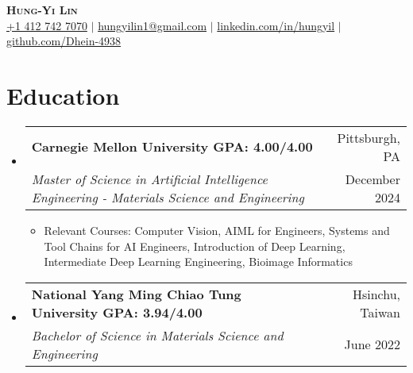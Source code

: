 \documentclass[a4paper,11pt]{article}
\makeatletter
\newcommand{\resumeItem}[1]{
  \item\small{
    {#1 \vspace{-1pt}}
  }
}
\newcommand{\resumeDoubleHeading}[4]{
  \vspace{-2pt}\item
    \begin{tabular*}{0.97\textwidth}[t]{l@{\extracolsep{\fill}}r}
        \textbf{#1} & #2 \\
        \textit{\small#3} & {\small #4} \\
    \end{tabular*}\vspace{-5pt}
}
\newcommand{\resumeSubHeadingListStart}{\begin{itemize}[leftmargin=0.15in, label={}]}
\newcommand{\resumeSubHeadingListEnd}{\end{itemize}}
\makeatother
\begin{document}

\begin{center}
    \textbf{\Huge \scshape Hung-Yi Lin} \\ \vspace{3pt}
    \small
    \faMobile \hspace{.5pt} \href{tel:14127427070}{+1 412 742 7070}
    $|$
    \faAt \hspace{.5pt} \href{mailto:hungyilin1@gmail.com}{hungyilin1@gmail.com}
    $|$
    \faLinkedinSquare \hspace{.5pt} \href{https://www.linkedin.com/in/hungyil}{linkedin.com/in/hungyil}
    $|$
    \faGithub \hspace{.5pt} \href{https://github.com/Dhein-4938}{github.com/Dhein-4938}
\end{center}



\section{Education}
\vspace{3pt}
\resumeSubHeadingListStart
    \resumeDoubleHeading
      {Carnegie Mellon University \textnormal{\small GPA: 4.00/4.00}}{Pittsburgh, PA}
      {Master of Science in Artificial Intelligence Engineering - Materials Science and Engineering}{December 2024}
    \resumeSubHeadingListStart
        \resumeItem{Relevant Courses: Computer Vision, AIML for Engineers, Systems and Tool Chains for AI Engineers, Introduction of Deep Learning, Intermediate Deep Learning Engineering, Bioimage Informatics}
    \resumeSubHeadingListEnd
    \resumeDoubleHeading
      {National Yang Ming Chiao Tung University  \textnormal{\small GPA: 3.94/4.00}}{Hsinchu, Taiwan}
      {Bachelor of Science in Materials Science and Engineering}{June 2022}
\resumeSubHeadingListEnd

\end{document}
